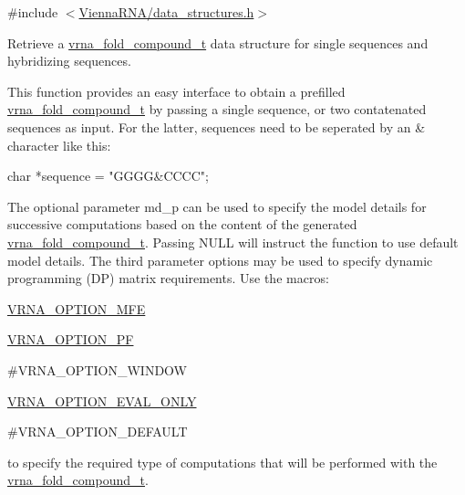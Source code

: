 {\ttfamily \#include $<$\hyperlink{data__structures_8h}{Vienna\+R\+N\+A/data\+\_\+structures.\+h}$>$}



Retrieve a \hyperlink{group__fold__compound_ga1b0cef17fd40466cef5968eaeeff6166}{vrna\+\_\+fold\+\_\+compound\+\_\+t} data structure for single sequences and hybridizing sequences. 

This function provides an easy interface to obtain a prefilled \hyperlink{group__fold__compound_ga1b0cef17fd40466cef5968eaeeff6166}{vrna\+\_\+fold\+\_\+compound\+\_\+t} by passing a single sequence, or two contatenated sequences as input. For the latter, sequences need to be seperated by an \textquotesingle{}\&\textquotesingle{} character like this\+:\begin{DoxyVerb}char *sequence = "GGGG&CCCC"; \end{DoxyVerb}


The optional parameter {\ttfamily md\+\_\+p} can be used to specify the model details for successive computations based on the content of the generated \hyperlink{group__fold__compound_ga1b0cef17fd40466cef5968eaeeff6166}{vrna\+\_\+fold\+\_\+compound\+\_\+t}. Passing N\+U\+L\+L will instruct the function to use default model details. The third parameter {\ttfamily options} may be used to specify dynamic programming (D\+P) matrix requirements. Use the macros\+:


\begin{DoxyItemize}
\item \hyperlink{group__fold__compound_gae63be9127fe7dcc1f9bb14f5bb1064ee}{V\+R\+N\+A\+\_\+\+O\+P\+T\+I\+O\+N\+\_\+\+M\+F\+E}
\item \hyperlink{group__fold__compound_gabfbadcddda3e74ce7f49035ef8f058f7}{V\+R\+N\+A\+\_\+\+O\+P\+T\+I\+O\+N\+\_\+\+P\+F}
\item \#\+V\+R\+N\+A\+\_\+\+O\+P\+T\+I\+O\+N\+\_\+\+W\+I\+N\+D\+O\+W
\item \hyperlink{group__fold__compound_ga61469c423131552c8483229f8b6c7e0e}{V\+R\+N\+A\+\_\+\+O\+P\+T\+I\+O\+N\+\_\+\+E\+V\+A\+L\+\_\+\+O\+N\+L\+Y}
\item \#\+V\+R\+N\+A\+\_\+\+O\+P\+T\+I\+O\+N\+\_\+\+D\+E\+F\+A\+U\+L\+T
\end{DoxyItemize}

to specify the required type of computations that will be performed with the \hyperlink{group__fold__compound_ga1b0cef17fd40466cef5968eaeeff6166}{vrna\+\_\+fold\+\_\+compound\+\_\+t}.

